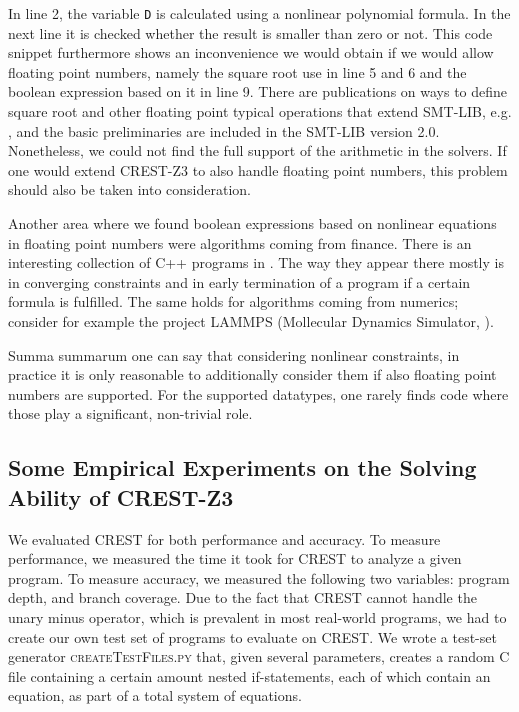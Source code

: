 \documentclass[oribibl]{llncs}
\begin{document}
In line 2, the variable \texttt{D} is calculated using a nonlinear polynomial
formula. In the next line it is checked whether the result is smaller
than zero or not.
This code snippet furthermore shows an inconvenience we would obtain
if we would allow floating point numbers, namely the square root use
in line 5 and 6 and the boolean expression based on it in line 9. There are publications on ways to define square root and other
floating point typical operations that extend \textsc{SMT-LIB},
e.g. \cite{rummer2010smt}, and the basic preliminaries are included in
the \textsc{SMT-LIB} version 2.0. Nonetheless, we could not find the
full support of the arithmetic in the solvers. If one would extend
\textsc{CREST-Z3} to also handle floating point numbers, this problem
should also be taken into consideration.

Another area where we found boolean expressions based on nonlinear equations in floating point numbers were algorithms coming from finance. There is an interesting collection of \textsc{C++} programs in \cite{odegaard2003financial}. The way they appear there mostly is in converging constraints and in early termination of a program if a certain formula is fulfilled. The same holds for algorithms coming from numerics; consider for example the project \textsc{LAMMPS} (Mollecular Dynamics Simulator, \cite{plimpton2007lammps}).

Summa summarum one can say that considering nonlinear constraints, in practice it is only reasonable to additionally consider them if also floating point numbers are supported. For the supported datatypes, one rarely finds code where those play a significant, non-trivial role.

\subsection{Some Empirical Experiments on the Solving Ability of \textsc{CREST-Z3}}
We evaluated CREST for both performance and accuracy. To measure performance, we measured the time it took for CREST to analyze a given program. To measure accuracy, we measured the following two variables: program depth, and branch coverage. Due to the fact that CREST cannot handle the unary minus operator, which is prevalent in most real-world programs, we had to create our own test set of programs to evaluate on CREST. We wrote a test-set generator \textsc{createTestFiles.py} that, given several parameters, creates a random C file containing a certain amount nested if-statements, each of which contain an equation, as part of a total system of equations. 
\end{document}
